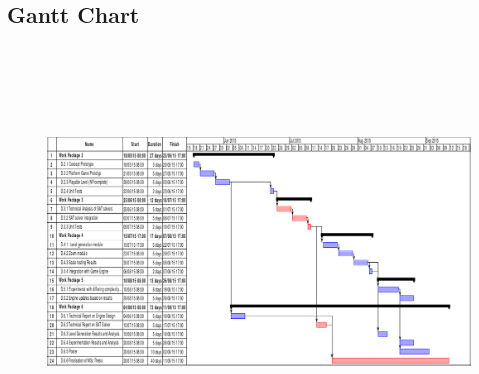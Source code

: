 \documentclass[a4paper]{article}
\begin{document}
\begin{landscape}
\subsection{Gantt Chart}
%   




% 



\begin{figure}[h]
  
  \centering
  \includegraphics[trim=0cm 0cm 0.0cm 0.0cm, clip=true, width=9in,height=4.25in, angle=0]{gantt2}
  \label{Gantt}
\end{figure}
\pagebreak
\end{landscape}
\end{document}
